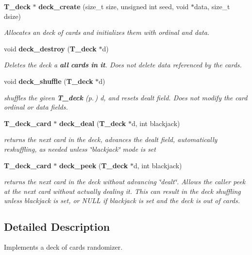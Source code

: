 \begin{CompactItemize}
\item 
{\bf T\_\-deck} $\ast$ {\bf deck\_\-create} (size\_\-t size, unsigned int seed, void $\ast$data, size\_\-t dsize)
\begin{CompactList}\small\item\em Allocates an deck of cards and initializes them with ordinal and data.\item\end{CompactList}\item 
void {\bf deck\_\-destroy} ({\bf T\_\-deck} $\ast$d)
\begin{CompactList}\small\item\em Deletes the deck a {\bf all} {\bf cards} {\bf in} {\bf it}. Does not delete data referenced by the cards.\item\end{CompactList}\item 
void {\bf deck\_\-shuffle} ({\bf T\_\-deck} $\ast$d)
\begin{CompactList}\small\item\em shuffles the given {\bf T\_\-deck} {\rm (p.\,\pageref{structT__deck})} d, and resets dealt field. Does not modify the card ordinal or data fields.\item\end{CompactList}\item 
{\bf T\_\-deck\_\-card} $\ast$ {\bf deck\_\-deal} ({\bf T\_\-deck} $\ast$d, int blackjack)
\begin{CompactList}\small\item\em returns the next card in the deck, advances the dealt field, automatically reshuffling, as needed unless \char`\"{}blackjack\char`\"{} mode is set\item\end{CompactList}\item 
{\bf T\_\-deck\_\-card} $\ast$ {\bf deck\_\-peek} ({\bf T\_\-deck} $\ast$d, int blackjack)
\begin{CompactList}\small\item\em returns the next card in the deck without advancing \char`\"{}dealt\char`\"{}. Allows the caller peek at the next card without actually dealing it. This can result in the deck shuffling unless blackjack is set, or NULL if blackjack is set and the deck is out of cards.\item\end{CompactList}\end{CompactItemize}


\subsection{Detailed Description}
Implements a deck of cards randomizer.



